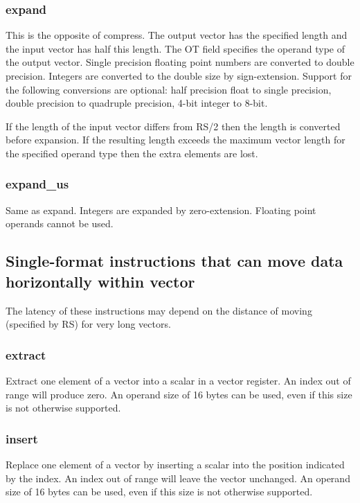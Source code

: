 \documentclass[forwardcom.tex]{subfiles}
\begin{document}
\subsubsection{expand}
This is the opposite of compress. The output vector has the specified length and the input vector has half this length. The OT field specifies the operand type of the output vector. Single precision floating point numbers are converted to double precision. Integers are converted to the double size by sign-extension. Support for the following conversions are optional: half precision float to single precision, double precision to quadruple precision, 4-bit integer to 8-bit.
\vspace{2mm}

If the length of the input vector differs from RS/2 then the length is converted before expansion. If the resulting length exceeds the maximum vector length for the specified operand type then the extra elements are lost.

\subsubsection{expand\_us}
Same as expand. Integers are expanded by zero-extension. Floating point operands cannot be used. 

\vspace{2mm}
\subsection{Single-format instructions that can move data horizontally within vector}
The latency of these instructions may depend on the distance of moving (specified by RS) for very long vectors.

\subsubsection{extract}
Extract one element of a vector into a scalar in a vector register. An index out of range will produce zero. An operand size of 16 bytes can be used, even if this size is not otherwise supported.

\subsubsection{insert}
Replace one element of a vector by inserting a scalar into the position indicated by the index. An index out of range will leave the vector unchanged. An operand size of 16 bytes can be used, even if this size is not otherwise supported.
\end{document}
